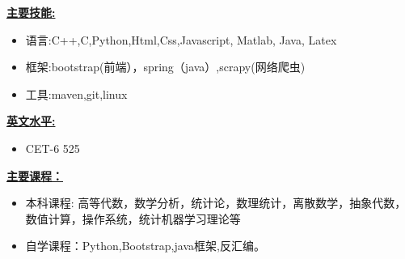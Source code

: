 \documentclass[UTF8] {ctexart}
\begin{document}
{\large \textbf{\underline{主要技能:}}}\\
\begin{itemize}
 \item 语言:C++,C,Python,Html,Css,Javascript, Matlab, Java, Latex
 \item 框架:bootstrap(前端），spring（java）,scrapy(网络爬虫)
 \item 工具:maven,git,linux
 \end{itemize}
\bigskip
{\large \textbf{\underline{英文水平:}}}
\begin{itemize}
\item CET-6 525
\end{itemize}
{\large \textbf{\underline{主要课程：}}}
\begin{itemize}
\item 本科课程: 高等代数，数学分析，统计论，数理统计，离散数学，抽象代数，数值计算，操作系统，统计机器学习理论等
\item 自学课程：Python,Bootstrap,java框架,反汇编。
\end{itemize}
\end{document}
